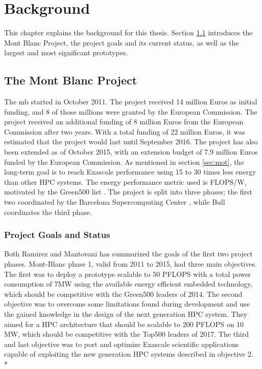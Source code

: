 \chapter{Background}
\label{ch:background}
This chapter explains the background for this thesis. Section \ref{sec:mbp} introduces the Mont Blanc Project, the project goals and its current status, as well as the largest and most significant prototypes.

\section{The Mont Blanc Project}
\label{sec:mbp}
The \gls{mb} \cite{m:MB} started in October 2011. The project received 14 million Euros as initial funding, and 8 of those millions were granted by the European Commission. The project received an additional funding of 8 million Euros from the European Commission after two years. With a total funding of 22 million Euros, it was estimated that the project would last until September 2016. The project has also been extended as of October 2015, with an extension budget of 7.9 million Euros funded by the European Commission. As mentioned in section \ref{sec:mot}, the long-term goal is to reach Exascale performance using 15 to 30 times less energy than other HPC systems. The energy performance metric used is FLOPS/W, motivated by the Green500 list \cite{m:Gr500}. The project is split into three phases; the first two coordinated by the Barcelona Supercomputing Center \cite{m:bsc}, while Bull \cite{m:bull} coordinates the third phase.

\subsection{Project Goals and Status}
Both Ramirez \cite{m:MB-PRACE-14} and Mantovani \cite{m:MB-15} has summarized the goals of the first two project phases. Mont-Blanc phase 1, valid from 2011 to 2015, had three main objectives. The first was to deploy a prototype scalable to 50 PFLOPS with a total power consumption of 7MW using the available energy efficient embedded technology, which should be competitive with the Green500 leaders of 2014. The second objective was to overcome some limitations found during development and use the gained knowledge in the design of the next generation HPC system. They aimed for a HPC architecture that should be scalable to 200 PFLOPS on 10 MW, which should be competitive with the Top500 leaders of 2017. The third and last objective was to port and optimize Exascale scientific applications capable of exploiting the new generation HPC systems described in objective 2. \\*

